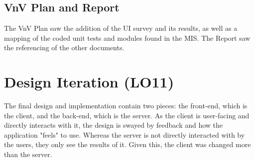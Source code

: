 \documentclass{article}
\begin{document}
\subsection{VnV Plan and Report}
The VnV Plan saw the addition of the UI survey and its results, as well as a mapping of the coded unit tests and modules found in the MIS. The Report saw 
the referencing of the other documents.

\section{Design Iteration (LO11)}

\noindent The final design and implementation contain two pieces: the front-end, which is the client, and the back-end, which is the server. As the client is user-facing and directly interacts with it, the design is swayed by feedback and how the application "feels" to use. Whereas the server is not directly interacted with by the users, they only see the results of it. Given this, the client was changed more than the server.
\end{document}
